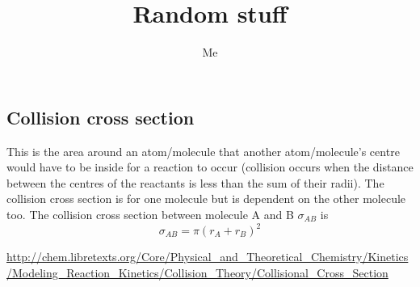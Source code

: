 \documentclass[11pt, oneside]{article}   	%
\title{Random stuff}
\author{Me}
\begin{document}
\maketitle

\subsection*{Collision cross section}
This is the area around an atom/molecule that another atom/molecule's centre would have to be inside for a reaction to occur (collision occurs when the distance between the centres of the reactants is less than the sum of their radii). The collision cross section is for one molecule but is dependent on the other molecule too.
The collision cross section between molecule A and B $\sigma_{AB}$ is 
\begin{equation}
\sigma_{AB} = \pi(r_A + r_B)^2
\end{equation}

\url{http://chem.libretexts.org/Core/Physical_and_Theoretical_Chemistry/Kinetics/Modeling_Reaction_Kinetics/Collision_Theory/Collisional_Cross_Section}
\end{document}
